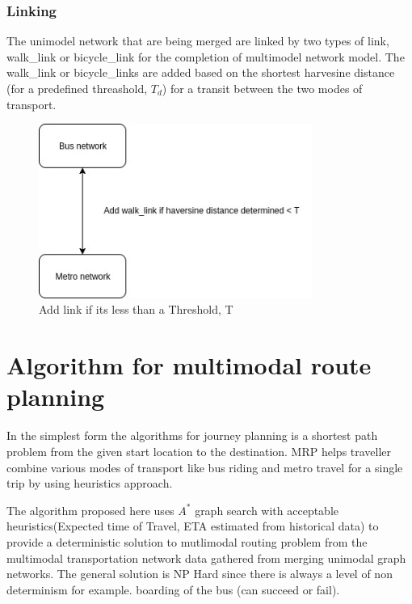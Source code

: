 \documentclass[12pt,a4paper]{article}
\begin{document}
\subsubsection{Linking}

The unimodel network that are being merged are linked by two types of link, walk\_link or bicycle\_link for the completion of multimodel network model. The walk\_link or bicycle\_links are added based on the shortest harvesine distance (for a predefined threashold, $T_{d}$) for a transit between the two modes of transport.

\begin{figure}[!hp]
    \centering
    \includegraphics[width=0.8\textwidth]{flowcharts/linkaddition.jpg}
    \caption{Add link if its less than a Threshold, T}
    \label{fig:Enduser flow}
\end{figure}

\section{Algorithm for multimodal route planning}

In the simplest form the algorithms for journey planning is a shortest path problem from the given start location to the destination. MRP helps traveller combine various modes of transport like bus riding and metro travel for a single trip by using heuristics approach. 

The algorithm proposed here uses $A^{*}$ graph search with acceptable heuristics(Expected time of Travel, ETA estimated from historical data) to provide a deterministic solution to mutlimodal routing problem from the multimodal transportation network data gathered from merging unimodal graph networks. The general solution is NP Hard since there is always a level of non determinism for example. boarding of the bus (can succeed or fail).
\end{document}
